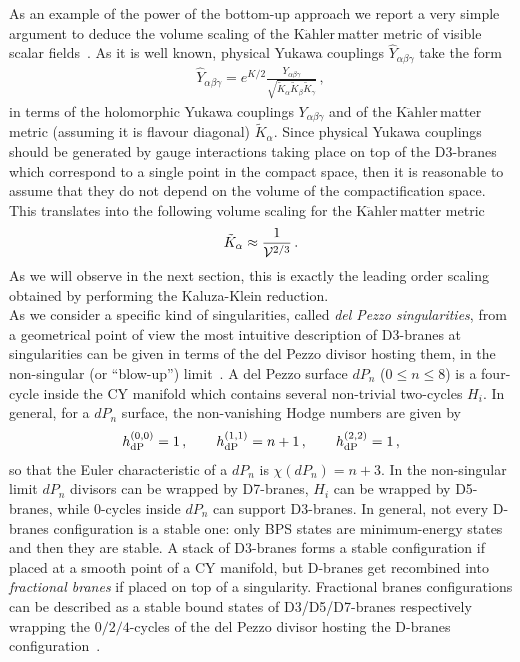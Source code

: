 \documentclass[12pt,a4paper]{book}
\newcommand{\Kahler}{\ensuremath{\text{K}\ddot{\text{a}}\text{hler}\,}}
\newcommand{\V}{{\cal{V}}}
\begin{document}
As an example of the power of the bottom-up approach we report a very simple argument to deduce the volume scaling of the \Kahler matter metric of visible scalar fields~\cite{Conlon:2008wa}. As it is well known, physical Yukawa couplings $\hat{Y}_{\alpha \beta \gamma}$ take the form
\begin{align}
\label{eq:HolomorphicYukawaCoupling}
\hat{Y}_{\alpha \beta \gamma} = e^{K/2} \frac{Y_{\alpha \beta \gamma}}{\sqrt{\tilde{K}_\alpha \tilde{K}_\beta \tilde{K}_\gamma}} \,,
\end{align}
in terms of the holomorphic Yukawa couplings $Y_{\alpha \beta \gamma}$ and of the \Kahler matter metric (assuming it is flavour diagonal) $\tilde{K}_\alpha$. Since physical Yukawa couplings should be generated by gauge interactions taking place on top of the D3-branes which correspond to a single point in the compact space, then it is reasonable to assume that they do not depend on the volume of the compactification space. This translates into the following volume scaling for the \Kahler matter metric
\begin{align}
\label{eq:KahlerMatterMetricScaling}
\tilde{K}_\alpha \approx \frac{1}{\V^{2/3}} \,.
\end{align}
As we will observe in the next section, this is exactly the leading order scaling obtained by performing the Kaluza-Klein reduction.\\

As we consider a specific kind of singularities, called \textit{del Pezzo singularities}, from a geometrical point of view the most intuitive description of D3-branes at singularities can be given in terms of the del Pezzo divisor hosting them, in the non-singular (or ``blow-up'') limit~\cite{Malyshev:2007zz}. A del Pezzo surface $dP_n$ ($0 \leq n \leq 8$) is a four-cycle inside the CY manifold which contains several non-trivial two-cycles $H_i$. In general, for a $dP_n$ surface, the non-vanishing Hodge numbers are given by
\begin{align}
\label{eq:HodgeDelPezzo}
h^{(0,0)}_{\rm dP} = 1 \,, \qquad h^{(1,1)}_{\rm dP} = n + 1 \,, \qquad h^{(2,2)}_{\rm dP} = 1 \,,
\end{align}
so that the Euler characteristic of a $dP_n$ is $\chi(dP_n) = n + 3$. In the non-singular limit $dP_n$ divisors can be wrapped by D7-branes, $H_i$ can be wrapped by D5-branes, while $0$-cycles inside $dP_n$ can support D3-branes. In general, not every D-branes configuration is a stable one: only BPS states are minimum-energy states and then they are stable. A stack of D3-branes forms a stable configuration if placed at a smooth point of a CY manifold, but D-branes get recombined into \textit{fractional branes} if placed on top of a singularity. Fractional branes configurations can be described as a stable bound states of D3/D5/D7-branes respectively wrapping the $0/2/4$-cycles of the del Pezzo divisor hosting the D-branes configuration~\cite{Malyshev:2007zz}.
\end{document}
